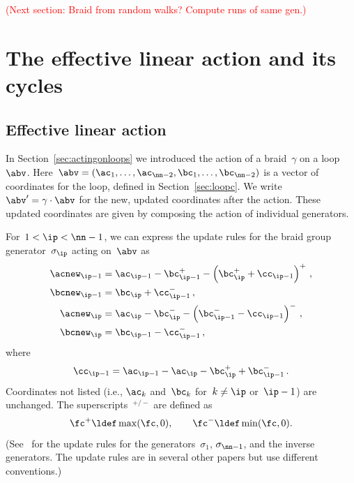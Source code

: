 \documentclass[12pt]{article}
\newcommand{\jlt}[1]{\textcolor{red}{(#1)}}
\renewcommand{\l}{\left}			%
\renewcommand{\r}{\right}			%
\newcommand{\pos}[1]{#1^+}
\renewcommand{\neg}[1]{#1^-}
\begin{document}
\jlt{Next section: Braid from random walks?  Compute runs of same gen.}


\section{The effective linear action and its cycles}
\label{sec:elacycles}

\subsection{Effective linear action}
\label{sec:linact}

%
%
%
%

In Section~\ref{sec:actingonloops} we introduced the action of a
braid~$\gamma$ on a loop~$\abv$.
Here~$\abv=(\ac_1,\ldots,\ac_{\nn-2},\bc_1,\ldots,\bc_{\nn-2})$ is a vector of
coordinates for the loop, %
%
defined in Section~\ref{sec:loopc}.  We write~$\abv' = \gamma\cdot\abv$ for
the new, updated coordinates after the action.  These updated coordinates are
given by composing the action of individual generators.

For~$1 < \ip < \nn-1$, we can express the update rules for the braid group
generator~$\sigma_\ip$ acting on~$\abv$ as
\begin{subequations}
\begin{align}
  \acnew_{\ip-1} &= \ac_{\ip-1} - \pos{\bc_{\ip-1}}
    - \pos{\l(\pos{\bc_\ip} + \cc_{\ip-1}\r)}\,,\\
  \bcnew_{\ip-1} &= \bc_\ip + \neg{\cc_{\ip-1}}\,,\\
  \acnew_\ip &= \ac_\ip - \neg{\bc_\ip}
    - \neg{\l(\neg{\bc_{\ip-1}} - \cc_{\ip-1}\r)}\,,\\
  \bcnew_\ip &= \bc_{\ip-1} - \neg{\cc_{\ip-1}}\,,
\end{align}
\label{eq:ur}%
\end{subequations}
where
\begin{equation}
  \cc_{\ip-1} = \ac_{\ip-1} - \ac_\ip - \pos{\bc_\ip} + \neg{\bc_{\ip-1}}\,.
  \label{eq:ccdef}
\end{equation}
Coordinates not listed (i.e., $\ac_k$ and~$\bc_k$ for~$k\ne\ip$ or~$\ip-1$)
are unchanged.  The superscripts~${}^{+/-}$ are defined as
\begin{equation}
  \pos\fc \ldef \max(\fc,0),\qquad
  \neg\fc \ldef \min(\fc,0).
\end{equation}
(See~\citet{Thiffeault2010} for the update rules for the
generators~$\sigma_1$, $\sigma_{\nn-1}$, and the inverse generators.  The
update rules are in several other papers but use different conventions.)
\end{document}
